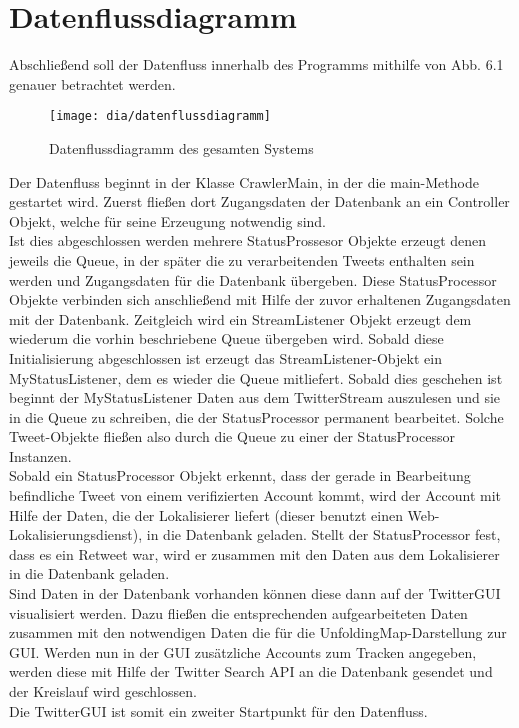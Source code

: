 \section{Datenflussdiagramm}
Abschließend soll der Datenfluss innerhalb des Programms mithilfe von Abb. 6.1 genauer betrachtet werden.

\begin{figure}[h!]
	\centering
	\texttt{[image: dia/datenflussdiagramm]}
	\caption{Datenflussdiagramm des gesamten Systems}
	\label{fig:datenflussdiagramm}
\end{figure}
Der Datenfluss beginnt in der Klasse CrawlerMain, in der die main-Methode gestartet wird. Zuerst fließen dort Zugangsdaten der Datenbank an ein Controller Objekt, welche für seine Erzeugung notwendig sind. \\
Ist dies abgeschlossen werden mehrere StatusProssesor Objekte erzeugt denen jeweils die Queue, in der später die zu verarbeitenden Tweets enthalten sein werden und Zugangsdaten für die Datenbank übergeben. Diese StatusProcessor Objekte verbinden sich anschließend mit Hilfe der zuvor erhaltenen Zugangsdaten mit der Datenbank. Zeitgleich wird ein StreamListener Objekt erzeugt dem wiederum die vorhin beschriebene Queue übergeben wird. Sobald diese Initialisierung abgeschlossen ist erzeugt das StreamListener-Objekt ein MyStatusListener, dem es wieder die Queue mitliefert. Sobald dies geschehen ist beginnt der MyStatusListener Daten aus dem TwitterStream auszulesen und sie in die Queue zu schreiben, die der StatusProcessor permanent bearbeitet. Solche Tweet-Objekte fließen also durch die Queue zu einer der StatusProcessor Instanzen. \\
Sobald ein StatusProcessor Objekt erkennt, dass der gerade in Bearbeitung befindliche Tweet von einem verifizierten Account kommt, wird der Account mit Hilfe der Daten, die  der Lokalisierer liefert (dieser benutzt einen Web-Lokalisierungsdienst), in die Datenbank geladen. Stellt der StatusProcessor fest, dass es ein Retweet war, wird er zusammen mit den Daten aus dem Lokalisierer in die Datenbank geladen.\\
Sind Daten in der Datenbank vorhanden können diese dann auf der TwitterGUI visualisiert werden. Dazu fließen die entsprechenden aufgearbeiteten Daten zusammen mit den notwendigen Daten die für die UnfoldingMap-Darstellung zur GUI. Werden nun in der GUI zusätzliche Accounts zum Tracken angegeben, werden diese mit Hilfe der Twitter Search API an die Datenbank gesendet und der Kreislauf wird geschlossen.\\
Die TwitterGUI ist somit ein zweiter Startpunkt für den Datenfluss.	
